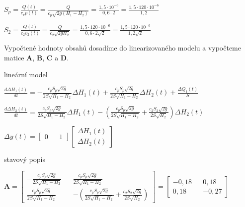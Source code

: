 \documentclass{article}
\begin{document}
			\begin{center}

			$S_p=\frac{Q(t)}{c_v p(t)}=\frac{Q}{c_p\sqrt{2g(H_1-H_2)}}=\frac{1,5\cdot 10^{-6}}{0,6 \cdot 2}=\frac{1,5 \cdot 120 \cdot 10^{-6}}{1,2}$

			\bigskip

			$S_2=\frac{Q(t)}{c_2v_2(t)}=\frac{Q}{c_2\sqrt{2gH_2}}=\frac{1,5 \cdot 120 \cdot 10^{-6}}{0,6 \cdot 2\sqrt{2}}=\frac{1,5 \cdot 120 \cdot 10^{-6}}{1,2\sqrt{2}}$
			\end{center}

			Vypočtené hodnoty obsahů dosadíme do linearizovaného modelu a vypočteme matice \textbf{A}, \textbf{B}, \textbf{C} a \textbf{D}.

			\begin{center}
			lineární model

			\bigskip

			$\frac{d\Delta H_1(t)}{dt}=-\frac{c_pS_p\sqrt{2g}}{2S\sqrt{H_1-H_2}}\Delta H_1(t)+\frac{c_pS_p\sqrt{2g}}{2S\sqrt{H_1-H_2}}\Delta H_2(t)+\frac{\Delta Q_1(t)}{S}$

			\bigskip

			$\frac{d\Delta H_2(t)}{dt}=\frac{c_pS_p\sqrt{2g}}{2S\sqrt{H_1-H_2}}\Delta H_1(t)-(\frac{c_pS_p\sqrt{2g}}{2S\sqrt{H_1-H_2}}+\frac{c_2S_2\sqrt{2g}}{2S\sqrt{H_2}})\Delta H_2(t)$

			\bigskip

			$\Delta y(t)=\begin{bmatrix}
			0 && 1
			\end{bmatrix}
			\begin{bmatrix}
			\Delta H_1(t)\\
			\Delta H_2(t)
			\end{bmatrix}$

			\bigskip

			stavový popis

			\bigskip

			$\textbf{A}=\begin{bmatrix}
			-\frac{c_pS_p\sqrt{2g}}{2S\sqrt{H_1-H_2}} && \frac{c_pS_p\sqrt{2g}}{2S\sqrt{H_1-H_2}} \\
			\frac{c_pS_p\sqrt{2g}}{2S\sqrt{H_1-H_2}} && -(\frac{c_pS_p\sqrt{2g}}{2S\sqrt{H_1-H_2}}+\frac{c_2S_2\sqrt{2g}}{2S\sqrt{H_2}})
			\end{bmatrix}=\begin{bmatrix}
			-0,18 && 0,18\\
			0,18&& -0,27
			\end{bmatrix}$


\end{center}
\end{document}

